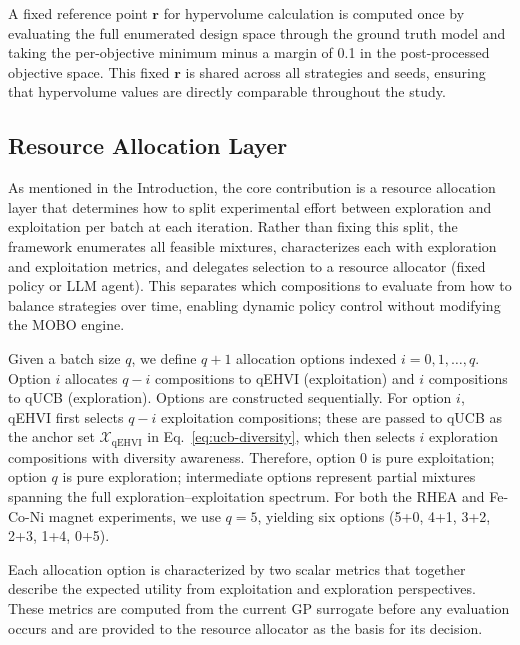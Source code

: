 \label{sec:reference-point}
A fixed reference point $\mathbf{r}$ for hypervolume calculation is computed once by evaluating the full enumerated design space through the ground truth model and taking the per-objective minimum minus a margin of 0.1 in the post-processed objective space. This fixed $\mathbf{r}$ is shared across all strategies and seeds, ensuring that hypervolume values are directly comparable throughout the study.


\subsection{Resource Allocation Layer}
\label{sec:allocation-framework}

As mentioned in the Introduction, the core contribution is a resource allocation layer that determines how to split experimental effort between exploration and exploitation per batch at each iteration. Rather than fixing this split, the framework enumerates all feasible mixtures, characterizes each with exploration and exploitation metrics, and delegates selection to a resource allocator (fixed policy or LLM agent). This separates which compositions to evaluate from how to balance strategies over time, enabling dynamic policy control without modifying the MOBO engine.

Given a batch size $q$, we define $q+1$ allocation options indexed $i = 0, 1, \ldots, q$. Option $i$ allocates $q - i$ compositions to qEHVI (exploitation) and $i$ compositions to qUCB (exploration). Options are constructed sequentially. For option $i$, qEHVI first selects $q-i$ exploitation compositions; these are passed to qUCB as the anchor set $\mathcal{X}_\mathrm{qEHVI}$ in Eq.~\eqref{eq:ucb-diversity}, which then selects $i$ exploration compositions with diversity awareness. Therefore, option 0 is pure exploitation; option $q$ is pure exploration; intermediate options represent partial mixtures spanning the full exploration--exploitation spectrum. %
For both the RHEA and Fe-Co-Ni magnet experiments, we use $q = 5$, yielding six options (5+0, 4+1, 3+2, 2+3, 1+4, 0+5).

Each allocation option is characterized by two scalar metrics that together describe the expected utility from exploitation and exploration perspectives. These metrics are computed from the current GP surrogate before any evaluation occurs and are provided to the resource allocator as the basis for its decision.

